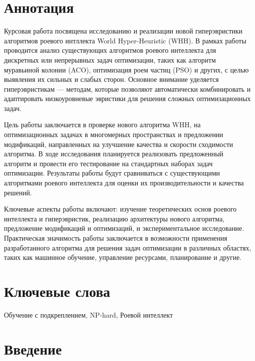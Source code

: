 \documentclass[a4paper,12pt]{extarticle}
\begin{document}
\newpage
\setcounter{page}{2}

{
	\hypersetup{linkcolor=black}
	\tableofcontents
}

\newpage

\newpage
\section*{Аннотация}   %
Курсовая работа посвящена исследованию и реализации новой гиперэвристики алгоритмов роевого интллекта World Hyper-Heuristic (WHH). В рамках работы проводится анализ существующих алгоритмов роевого интеллекта для дискретных или непрерывных задач оптимизации, таких как алгоритм муравьиной колонии (ACO), оптимизация роем частиц (PSO) и других, с целью выявления их сильных и слабых сторон. Основное внимание уделяется гиперэвристикам — методам, которые позволяют автоматически комбинировать и адаптировать низкоуровневые эвристики для решения сложных оптимизационных задач.

Цель работы заключается в проверке нового алгоритма WHH, на оптимизационных задачах в многомерных пространствах и предложении модификаций, направленных на улучшение качества и скорости сходимости алгоритма. В ходе исследования планируется реализовать предложенный алгоритм и провести его тестирование на стандартных наборах задач оптимизации. Результаты работы будут сравниваться с существующими алгоритмами роевого интеллекта для оценки их производительности и качества решений.

Ключевые аспекты работы включают: изучение теоретических основ роевого интеллекта и гиперэвристик, реализацию архитектуры нового алгоритма, предложение модификаций и оптимизаций, и экспериментальное исследование. Практическая значимость работы заключается в возможности применения разработанного алгоритма для решения задач оптимизации в различных областях, таких как машинное обучение, управление ресурсами, планирование и другие.


\section*{Ключевые слова}
Обучение с подкреплением, NP-hard, Роевой интеллект
\pagebreak

\section{Введение}
\end{document}
